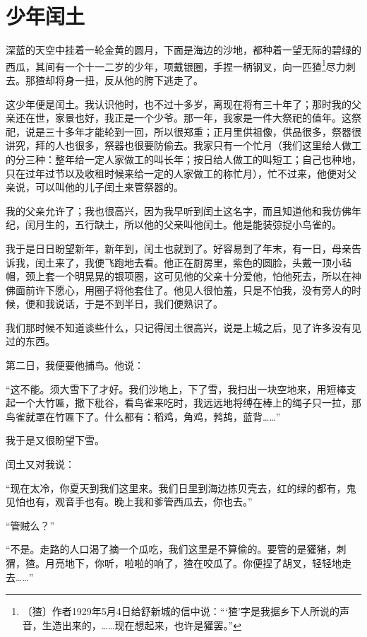 \documentclass[12pt,UTF-8,openany]{ctexbook}
\begin{document}
\chapter{少年闰土}

\begin{Large}
    
    深蓝的天空中挂着一轮金黄的圆月，下面是海边的沙地，都种着一望无际的碧绿的西瓜，其间有一个十一二岁的少年，项戴银圈，手捏一柄钢叉，向一匹猹\footnote{〔猹〕作者1929年5月4日给舒新城的信中说：“‘猹’字是我据乡下人所说的声音，生造出来的，……现在想起来，也许是獾罢。”}尽力刺去。那猹却将身一扭，反从他的胯下逃走了。
    
    这少年便是闰土。我认识他时，也不过十多岁，离现在将有三十年了；那时我的父亲还在世，家景也好，我正是一个少爷。那一年，我家是一件大祭祀的值年。这祭祀，说是三十多年才能轮到一回，所以很郑重；正月里供祖像，供品很多，祭器很讲究，拜的人也很多，祭器也很要防偷去。我家只有一个忙月（我们这里给人做工的分三种：整年给一定人家做工的叫长年；按日给人做工的叫短工；自己也种地，只在过年过节以及收租时候来给一定的人家做工的称忙月），忙不过来，他便对父亲说，可以叫他的儿子闰土来管祭器的。
    
    我的父亲允许了；我也很高兴，因为我早听到闰土这名字，而且知道他和我仿佛年纪，闰月生的，五行缺土，所以他的父亲叫他闰土。他是能装弶捉小鸟雀的。
    
    我于是日日盼望新年，新年到，闰土也就到了。好容易到了年末，有一日，母亲告诉我，闰土来了，我便飞跑地去看。他正在厨房里，紫色的圆脸，头戴一顶小毡帽，颈上套一个明晃晃的银项圈，这可见他的父亲十分爱他，怕他死去，所以在神佛面前许下愿心，用圈子将他套住了。他见人很怕羞，只是不怕我，没有旁人的时候，便和我说话，于是不到半日，我们便熟识了。
    
    我们那时候不知道谈些什么，只记得闰土很高兴，说是上城之后，见了许多没有见过的东西。
    
    第二日，我便要他捕鸟。他说：
    
    “这不能。须大雪下了才好。我们沙地上，下了雪，我扫出一块空地来，用短棒支起一个大竹匾，撒下秕谷，看鸟雀来吃时，我远远地将缚在棒上的绳子只一拉，那鸟雀就罩在竹匾下了。什么都有：稻鸡，角鸡，鹁鸪，蓝背……”
    
    我于是又很盼望下雪。
    
    闰土又对我说：
    
    “现在太冷，你夏天到我们这里来。我们日里到海边拣贝壳去，红的绿的都有，鬼见怕也有，观音手也有。晚上我和爹管西瓜去，你也去。”
    
    “管贼么？”
    
    “不是。走路的人口渴了摘一个瓜吃，我们这里是不算偷的。要管的是獾猪，刺猬，猹。月亮地下，你听，啦啦的响了，猹在咬瓜了。你便捏了胡叉，轻轻地走去……”
    

\end{Large}
\end{document}
